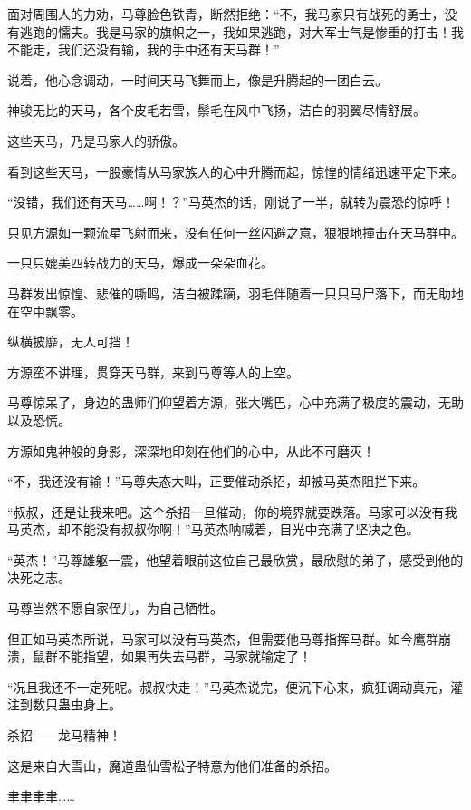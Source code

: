 
\begin{this_body}

面对周围人的力劝，马尊脸色铁青，断然拒绝：“不，我马家只有战死的勇士，没有逃跑的懦夫。我是马家的旗帜之一，我如果逃跑，对大军士气是惨重的打击！我不能走，我们还没有输，我的手中还有天马群！”

说着，他心念调动，一时间天马飞舞而上，像是升腾起的一团白云。

神骏无比的天马，各个皮毛若雪，鬃毛在风中飞扬，洁白的羽翼尽情舒展。

这些天马，乃是马家人的骄傲。

看到这些天马，一股豪情从马家族人的心中升腾而起，惊惶的情绪迅速平定下来。

“没错，我们还有天马……啊！？”马英杰的话，刚说了一半，就转为震恐的惊呼！

只见方源如一颗流星飞射而来，没有任何一丝闪避之意，狠狠地撞击在天马群中。

一只只媲美四转战力的天马，爆成一朵朵血花。

马群发出惊惶、悲催的嘶鸣，洁白被蹂躏，羽毛伴随着一只只马尸落下，而无助地在空中飘零。

纵横披靡，无人可挡！

方源蛮不讲理，贯穿天马群，来到马尊等人的上空。

马尊惊呆了，身边的蛊师们仰望着方源，张大嘴巴，心中充满了极度的震动，无助以及恐慌。

方源如鬼神般的身影，深深地印刻在他们的心中，从此不可磨灭！

“不，我还没有输！”马尊失态大叫，正要催动杀招，却被马英杰阻拦下来。

“叔叔，还是让我来吧。这个杀招一旦催动，你的境界就要跌落。马家可以没有我马英杰，却不能没有叔叔你啊！”马英杰呐喊着，目光中充满了坚决之色。

“英杰！”马尊雄躯一震，他望着眼前这位自己最欣赏，最欣慰的弟子，感受到他的决死之志。

马尊当然不愿自家侄儿，为自己牺牲。

但正如马英杰所说，马家可以没有马英杰，但需要他马尊指挥马群。如今鹰群崩溃，鼠群不能指望，如果再失去马群，马家就输定了！

“况且我还不一定死呢。叔叔快走！”马英杰说完，便沉下心来，疯狂调动真元，灌注到数只蛊虫身上。

杀招——龙马精神！

这是来自大雪山，魔道蛊仙雪松子特意为他们准备的杀招。

聿聿聿聿……


\end{this_body}
